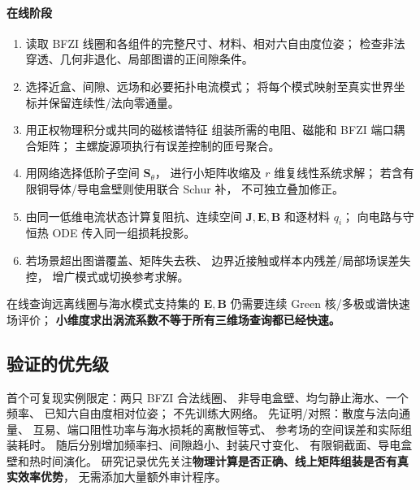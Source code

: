 \paragraph{在线阶段}
\begin{enumerate}
\item 读取 BFZI 线圈和各组件的完整尺寸、材料、相对六自由度位姿；
检查非法穿透、几何非退化、局部图谱的正间隙条件。
\item 选择近盒、间隙、远场和必要拓扑电流模式；
将每个模式映射至真实世界坐标并保留连续性/法向零通量。
\item 用正权物理积分或共同的磁核谱特征
组装所需的电阻、磁能和 BFZI 端口耦合矩阵；
主螺旋源项执行有误差控制的匝号聚合。
\item 用网络选择低阶子空间 \(\bm S_\theta\)，
进行小矩阵收缩及 \(r\) 维复线性系统求解；
若含有限铜导体/导电盒壁则使用联合 Schur 补，
不可独立叠加修正。
\item 由同一低维电流状态计算复阻抗、连续空间
\(\bm J,\bm E,\bm B\) 和逐材料 \(q_i\)；
向电路与守恒热 ODE 传入同一组损耗投影。
\item 若场景超出图谱覆盖、矩阵失去秩、
边界近接触或样本内残差/局部场误差失控，
增广模式或切换参考求解。
\end{enumerate}
在线查询远离线圈与海水模式支持集的
\(\bm E,\bm B\) 仍需要连续 Green 核/多极或谱快速场评价；
\textbf{小维度求出涡流系数不等于所有三维场查询都已经快速。}

\subsection{验证的优先级}
首个可复现实例限定：两只 BFZI 合法线圈、
非导电盒壁、均匀静止海水、一个频率、
已知六自由度相对位姿；
不先训练大网络。
先证明/对照：散度与法向通量、
互易、端口阻性功率与海水损耗的离散恒等式、
参考场的空间误差和实际组装耗时。
随后分别增加频率扫、间隙趋小、封装尺寸变化、
有限铜截面、导电盒壁和热时间演化。
研究记录优先关注\textbf{物理计算是否正确、线上矩阵组装是否有真实效率优势}，
无需添加大量额外审计程序。
